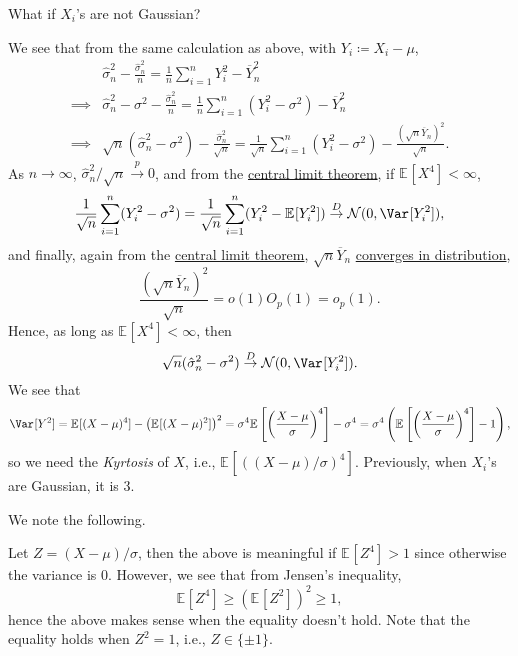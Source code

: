 \begin{problem*}
	What if \(X_i\)'s are not Gaussian?
\end{problem*}
\begin{answer}
	We see that from the same calculation as above, with \(Y_i \coloneqq X_i - \mu \),
	\[
		\begin{split}
			         & \hat{\sigma} _n^2 - \frac{\hat{\sigma} _n^2}{n} = \frac{1}{n} \sum_{i=1}^{n} Y_i^2 - \overline{Y} _n^2                                                                                    \\
			\implies & \hat{\sigma} _n^2 - \sigma ^2 - \frac{\hat{\sigma} _n^2}{n} = \frac{1}{n} \sum_{i=1}^{n} (Y_i^2 - \sigma ^2)- \overline{Y} _n^2                                                           \\
			\implies & \sqrt{n}(\hat{\sigma } _n^2 - \sigma ^2) - \frac{\hat{\sigma} _n^2}{\sqrt{n} } = \frac{1}{\sqrt{n} } \sum_{i=1}^{n} (Y_i^2 - \sigma ^2) - \frac{(\sqrt{n} \overline{Y} _n)^2}{\sqrt{n} }.
		\end{split}
	\]
	As \(n \to \infty \), \(\hat{\sigma} _n^2 / \sqrt{n} \overset{p}{\to } 0\), and from the \hyperref[thm:CLT]{central limit theorem}, if \(\mathbb{E}_{}[X^4] < \infty \),
	\[
		\frac{1}{\sqrt{n} } \sum_{i=1}^{n} (Y_i^2 - \sigma ^2)
		= \frac{1}{\sqrt{n} } \sum_{i=1}^{n} (Y_i^2 - \mathbb{E}_{}[Y_i^2] )
		\overset{D}{\to } \mathcal{N} (0, \Var_{}[Y_i^2] ),
	\]
	and finally, again from the \hyperref[thm:CLT]{central limit theorem}, \(\sqrt{n} \overline{Y} _n\) \hyperref[def:converge-in-distribution]{converges in distribution},
	\[
		\frac{(\sqrt{n} \overline{Y} _n) ^2}{\sqrt{n} }
		= o(1) O_p(1)
		= o_p(1).
	\]
	Hence, as long as \(\mathbb{E}_{}[X^4] < \infty \), then
	\[
		\sqrt{n} (\hat{\sigma} _n^2 - \sigma ^2)
		\overset{D}{\to } \mathcal{N} (0, \Var_{}[Y_i^2] ).
	\]
	We see that
	\[
		\Var_{}[Y^2]
		= \mathbb{E}_{}[(X - \mu )^4]  - \left( \mathbb{E}_{}[(X-\mu )^2] \right) ^2
		= \sigma ^4 \mathbb{E}_{}\left[\left( \frac{X-\mu }{\sigma } \right) ^4 \right] - \sigma ^4
		= \sigma ^4 \left( \mathbb{E}_{}\left[\left( \frac{X-\mu }{\sigma } \right) ^4 \right] - 1 \right),
	\]
	so we need the \emph{Kyrtosis} of \(X\), i.e., \(\mathbb{E}_{}[( (X-\mu ) / \sigma )^4] \). Previously, when \(X_i\)'s are Gaussian, it is \(3\).
\end{answer}

We note the following.

\begin{note}
	Let \(Z = (X-\mu ) / \sigma \), then the above is meaningful if \(\mathbb{E}_{}[Z^4] > 1\) since otherwise the variance is \(0\). However, we see that from Jensen's inequality,
	\[
		\mathbb{E}_{}[Z^4] \geq \left( \mathbb{E}_{}[Z^2] \right) ^2 \geq 1,
	\]
	hence the above makes sense when the equality doesn't hold. Note that the equality holds when \(Z^2 = 1\), i.e., \(Z \in \{ \pm 1 \} \).
\end{note}
